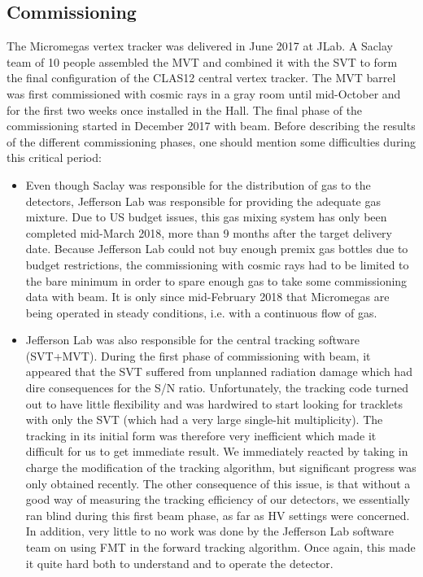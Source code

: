 \subsection{Commissioning}

The Micromegas vertex tracker was delivered in June 2017 at JLab. A Saclay team of 10 people assembled the MVT and 
combined it with the SVT to form the final configuration of the CLAS12 central vertex tracker.  The MVT barrel was 
first commissioned with cosmic rays in a gray room until mid-October and for the first two weeks once installed in the 
Hall. The final phase of the commissioning started in December 2017 with beam. Before describing the results of the 
different commissioning phases, one should mention some difficulties during this critical period:

\begin{itemize}
 \item Even though Saclay was responsible for the distribution of gas to the detectors, Jefferson Lab was responsible 
for providing the adequate gas mixture. Due to US budget issues, this gas mixing system has only been completed 
mid-March 2018, more than 9 months after the target delivery date. Because Jefferson Lab could not buy enough premix 
gas bottles due to budget restrictions, the commissioning with cosmic rays had to be limited to the bare minimum in 
order to spare enough gas to take some commissioning data with beam. It is only since mid-February 2018 that Micromegas 
are being operated in steady conditions, i.e. with a continuous flow of gas.
 
 \item Jefferson Lab was also responsible for the central tracking software (SVT+MVT). During the first phase of 
commissioning with beam, it appeared that the SVT suffered from unplanned radiation damage which had dire consequences 
for the S/N ratio. Unfortunately, the tracking code turned out to have little flexibility and was hardwired to start 
looking for tracklets with only the SVT (which had a very large single-hit multiplicity). The tracking in its initial 
form was therefore very inefficient which made it difficult for us to get immediate result. We immediately reacted by 
taking in charge the modification of the tracking algorithm, but significant progress was only obtained recently. The 
other consequence of this issue, is that without a good way of measuring the tracking efficiency of our detectors, we 
essentially ran blind during this first beam phase, as far as HV settings were concerned. In addition, very little to 
no work was done by the Jefferson Lab software team on using FMT in the forward tracking algorithm. Once again, this 
made it quite hard both to understand and to operate the detector.

\end{itemize}

